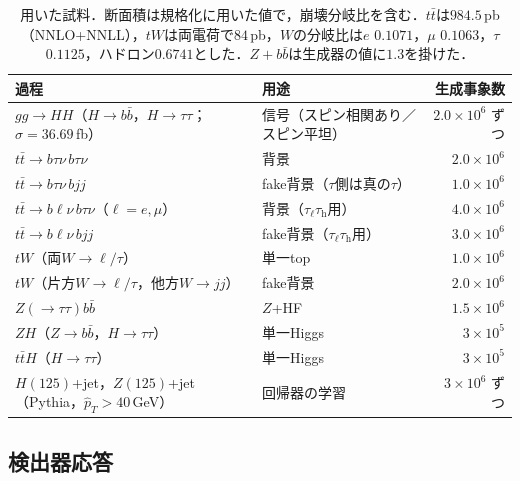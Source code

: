 \documentclass[paper=a4,fontsize=10pt,jafontsize=10pt,line_length=44zw,number_of_lines=46]{jlreq}
\newcommand{\tauh}{\tau_{\mathrm{h}}}
\newcommand{\taul}{\tau_{\ell}}
\begin{document}
\begin{table}[t]
  \centering
  \caption{用いた試料．断面積は規格化に用いた値で，崩壊分岐比を含む．$t\bar t$は$984.5$\,pb（NNLO+NNLL），$tW$は両電荷で$84$\,pb，$W$の分岐比は$e$ $0.1071$，$\mu$ $0.1063$，$\tau$ $0.1125$，ハドロン$0.6741$とした．$Z+b\bar b$は生成器の値に$1.3$を掛けた．}
  \label{tab:samples}
  \small
  \begin{tabular}{llr}
    \toprule
    過程 & 用途 & 生成事象数 \\
    \midrule
    $gg\to HH$（$H\to b\bar b$，$H\to\tau\tau$；$\sigma=36.69$\,fb） & 信号（スピン相関あり／スピン平坦） & $2.0\times10^6$ ずつ \\
    $t\bar t\to b\tau\nu\,b\tau\nu$ & 背景 & $2.0\times10^6$ \\
    $t\bar t\to b\tau\nu\,bjj$ & fake背景（$\tau$側は真の$\tau$） & $1.0\times10^6$ \\
    $t\bar t\to b\ell\nu\,b\tau\nu$（$\ell=e,\mu$） & 背景（$\taul\tauh$用） & $4.0\times10^6$ \\
    $t\bar t\to b\ell\nu\,bjj$ & fake背景（$\taul\tauh$用） & $3.0\times10^6$ \\
    $tW$（両$W\to\ell/\tau$） & 単一top & $1.0\times10^6$ \\
    $tW$（片方$W\to\ell/\tau$，他方$W\to jj$） & fake背景 & $2.0\times10^6$ \\
    $Z(\to\tau\tau)b\bar b$ & $Z$+HF & $1.5\times10^6$ \\
    $ZH$（$Z\to b\bar b$，$H\to\tau\tau$） & 単一Higgs & $3\times10^5$ \\
    $t\bar tH$（$H\to\tau\tau$） & 単一Higgs & $3\times10^5$ \\
    $H(125)$+jet，$Z(125)$+jet（Pythia，$\hat p_T>40$\,GeV） & 回帰器の学習 & $3\times10^6$ ずつ \\
    \bottomrule
  \end{tabular}
\end{table}

\subsection{検出器応答}
\end{document}
